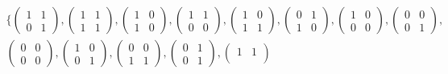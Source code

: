 \documentclass[class=scrartcl, crop=false]{standalone}
\begin{document}
\begin{definition}
\begin{example}
\begin{gather*}
      \{
        \begin{pmatrix}
          1 & 1 \\
          0 & 1
        \end{pmatrix} ,
        \begin{pmatrix}
          1 & 1 \\
          1 & 1
        \end{pmatrix} ,
        \begin{pmatrix}
          1 & 0 \\
          1 & 0
        \end{pmatrix} ,
        \begin{pmatrix}
          1 & 1 \\
          0 & 0
        \end{pmatrix} ,
        \begin{pmatrix}
          1 & 0\\
          1 & 1
        \end{pmatrix} ,
        \begin{pmatrix}
          0 & 1 \\
          1 & 0
        \end{pmatrix} ,
        \begin{pmatrix}
          1 & 0 \\
          0 & 0
        \end{pmatrix} ,
        \begin{pmatrix}
          0 & 0 \\
          0 & 1
        \end{pmatrix} , \\
        \begin{pmatrix}
          0 & 0 \\
          0 & 0
        \end{pmatrix} ,
        \begin{pmatrix}
          1 & 0 \\
          0 & 1
        \end{pmatrix} ,
        \begin{pmatrix}
           0 & 0 \\
           1 & 1
        \end{pmatrix} ,
        \begin{pmatrix}
          0 & 1 \\
          0 & 1
        \end{pmatrix} ,
        \begin{pmatrix}
          1 & 1 \\

\end{pmatrix}
\end{gather*}
\end{example}
\end{definition}
\end{document}
